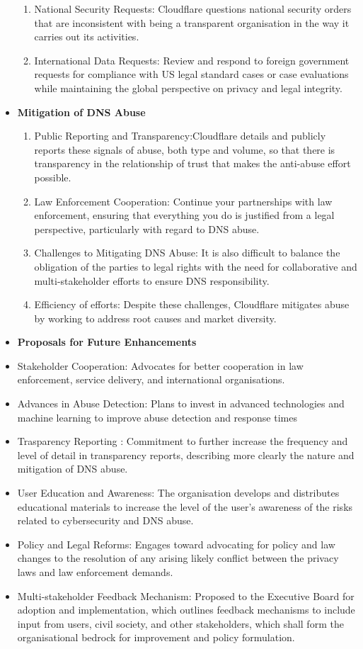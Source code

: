 \begin{itemize}
\begin{enumerate}
        \item National Security Requests: Cloudflare questions national security orders that are inconsistent with being a transparent organisation in the way it carries out its activities.
        \item International Data Requests: Review and respond to foreign government requests for compliance with US legal standard cases or case evaluations while maintaining the global perspective on privacy and legal integrity. 
    \end{enumerate}
    \item \textbf{Mitigation of DNS Abuse}
    \begin{enumerate}
        \item Public Reporting and Transparency:Cloudflare details and publicly reports these signals of abuse, both type and volume, so that there is transparency in the relationship of trust that makes the anti-abuse effort possible.
        \item Law Enforcement Cooperation: Continue your partnerships with law enforcement, ensuring that everything you do is justified from a legal perspective, particularly with regard to DNS abuse.
        \item Challenges to Mitigating DNS Abuse: It is also difficult to balance the obligation of the parties to legal rights with the need for collaborative and multi-stakeholder efforts to ensure DNS responsibility.
        \item Efficiency of efforts: Despite these challenges, Cloudflare mitigates abuse by working to address root causes and market diversity.
    \end{enumerate}
    \item \textbf{Proposals for Future Enhancements}
    \item Stakeholder Cooperation: Advocates for better cooperation in law enforcement, service delivery, and international organisations.
    \item Advances in Abuse Detection: Plans to invest in advanced technologies and machine learning to improve abuse detection and response times
    \item Trasparency Reporting : Commitment to further increase the frequency and level of detail in transparency reports, describing more clearly the nature and mitigation of DNS abuse. 
    \item User Education and Awareness: The organisation develops and distributes educational materials to increase the level of the user's awareness of the risks related to cybersecurity and DNS abuse.
    \item Policy and Legal Reforms: Engages toward advocating for policy and law changes to the resolution of any arising likely conflict between the privacy laws and law enforcement demands. 
    \item Multi-stakeholder Feedback Mechanism: Proposed to the Executive Board for adoption and implementation, which outlines feedback mechanisms to include input from users, civil society, and other stakeholders, which shall form the organisational bedrock for improvement and policy formulation.
        

\end{itemize}
